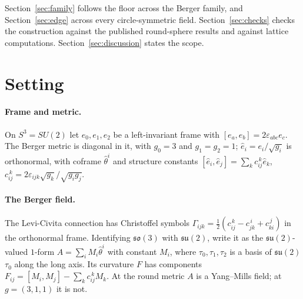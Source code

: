 \documentclass[11pt]{article}
\theoremstyle{definition}
\theoremstyle{remark}
\newif\ifredline
\newcommand{\redins}[1]{\ifredline{\color{blue}#1}\else#1\fi}
\newcommand{\reddel}[1]{\ifredline{\color{red}\sout{#1}}\fi}
\newcommand{\su}{\mathfrak{su}(2)}
\begin{document}
Section~\ref{sec:family} follows the floor across the Berger family\redins{, and Section~\ref{sec:edge} across every
circle-symmetric field}.
Section~\ref{sec:checks} checks the construction against the published round-sphere results and
against lattice computations. Section~\ref{sec:discussion} states the scope.

\section{Setting}\label{sec:setting}

\paragraph{Frame and metric.} On $S^3=SU(2)$ let $e_0,e_1,e_2$ be a left-invariant frame with
$[e_a,e_b]=2\varepsilon_{abc}e_c$. The Berger metric is diagonal in it, with $g_0=3$ and $g_1=g_2=1$;
$\hat e_i=e_i/\sqrt{g_i}$ is orthonormal, with coframe $\hat\theta^i$ and structure constants
$[\hat e_i,\hat e_j]=\sum_kc_{ij}^{\,k}\hat e_k$, $c_{ij}^{\,k}=2\varepsilon_{ijk}\sqrt{g_k}/\sqrt{g_ig_j}$.

\paragraph{The Berger field.} The Levi-Civita connection has Christoffel symbols
$\Gamma_{ijk}=\tfrac12(c_{ij}^{\,k}-c_{jk}^{\,i}+c_{ki}^{\,j})$ in the orthonormal frame. Identifying
$\mathfrak{so}(3)$ with $\su$, write it as the $\su$-valued $1$-form $A=\sum_iM_i\hat\theta^i$ with
constant $M_i$, where $\tau_0,\tau_1,\tau_2$ is a basis of $\su$ \reddel{with the same brackets as the frame,}
$\tau_0$ along the long axis.
Its curvature $F$ has components $F_{ij}=[M_i,M_j]-\sum_kc_{ij}^{\,k}M_k$. At the round metric $A$ is
a Yang--Mills field; at $g=(3,1,1)$ it is not.
\end{document}
